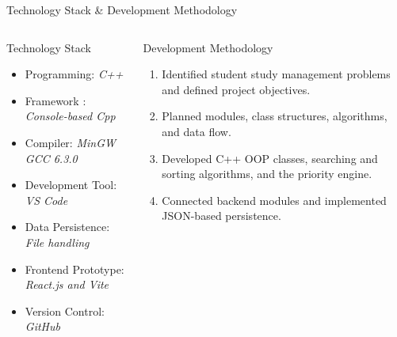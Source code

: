 \documentclass[aspectratio=169,11pt]{beamer}
\newcommand{\placeholder}[1]{%
\textit{\color{GEUGrey}#1}
}
\begin{document}
\begin{frame}{Technology Stack \& Development Methodology}

\begin{columns}[T,totalwidth=\textwidth]

\vspace{-0.5cm}
\begin{block}{Technology Stack}

\begin{itemize}\itemsep2pt
\item Programming: \placeholder{ C++ }
\item Framework : \placeholder{Console-based Cpp}
\item Compiler: \placeholder{MinGW GCC 6.3.0}
\item Development Tool: \placeholder{VS Code}
\item Data Persistence: \placeholder{File handling}
\item Frontend Prototype: \placeholder{React.js and Vite}
\item Version Control: \placeholder{GitHub}
\end{itemize}

\end{block}

\vspace{-0.5cm}

\begin{block}{Development Methodology}

\begin{enumerate}\itemsep2pt
\item Identified student study management problems and defined project objectives.
\item Planned modules, class structures, algorithms, and data flow.
\item Developed C++ OOP classes, searching and sorting algorithms, and the priority engine.
\item Connected backend modules and implemented JSON-based persistence.
\end{enumerate}

\end{block}

\end{columns}

\vfill


\end{frame}
\end{document}
